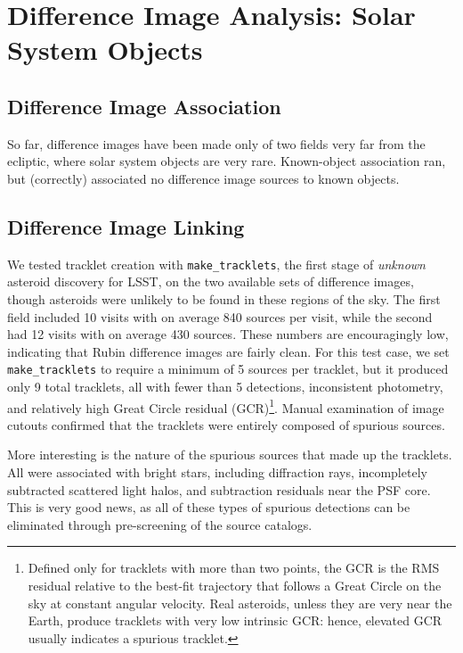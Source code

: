 \section{Difference Image Analysis: Solar System Objects}
\label{sec:dia_solar_system}

\subsection{Difference Image Association}
\label{sec:dia_solar_system_assoc}

So far, difference images have been made only of two fields very far from the ecliptic, where solar system objects are very rare. Known-object association ran, but (correctly) associated no difference image sources to known objects. 

\subsection{Difference Image Linking}
\label{sec:dia_solar_system_link}

We tested tracklet creation with {\tt make\_tracklets}, the first stage of {\em unknown} asteroid discovery for LSST, on the two available sets of difference images, though asteroids were unlikely to be found in these regions of the sky. The first field included 10 visits with on average 840 sources per visit, while the second had 12 visits with on average 430 sources. These numbers are encouragingly low, indicating that Rubin difference images are fairly clean. For this test case, we set {\tt make\_tracklets} to require a minimum of 5 sources per tracklet, but it produced only 9 total tracklets, all with fewer than 5 detections, inconsistent photometry, and relatively high Great Circle residual (GCR)\footnote{Defined only for tracklets with more than two points, the GCR is the RMS residual relative to the best-fit trajectory that follows a Great Circle on the sky at constant angular velocity. Real asteroids, unless they are very near the Earth, produce tracklets with very low intrinsic GCR: hence, elevated GCR usually indicates a spurious tracklet.}. Manual examination of image cutouts confirmed that the tracklets were entirely composed of spurious sources.

More interesting is the nature of the spurious sources that made up the tracklets. All were associated with bright stars, including diffraction rays, incompletely subtracted scattered light halos, and subtraction residuals near the PSF core. This is very good news, as all of these types of spurious detections can be eliminated through pre-screening of the source catalogs. 

